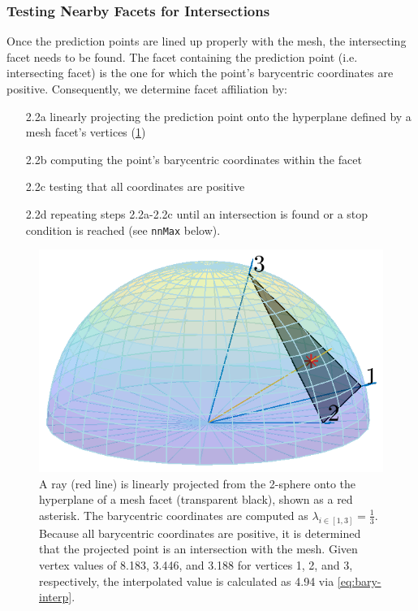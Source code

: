 \documentclass[final,twocolumn,12pt]{elsarticle}
\newcommand{\outpt}{prediction}
\begin{document}
{\begin{appendices}
\subsubsection{Testing Nearby Facets for Intersections}
\label{sec:app:bary:int:facets}
Once the \outpt{} points are lined up properly with the mesh, the intersecting facet needs to be found. The facet containing the \outpt{} point (i.e. intersecting facet) is the one for which the point's barycentric coordinates are positive. Consequently, we determine facet affiliation by:
\begin{enumerate}
    \item[2.2a] linearly projecting the \outpt{} point onto the hyperplane defined by a mesh facet's vertices (\cref{fig:bary-interp})
    \item[2.2b] computing the point's barycentric coordinates within the facet
    \item[2.2c] testing that all coordinates are positive \cite{langerSphericalBarycentricCoordinates2006}
    \item[2.2d] repeating steps 2.2a-2.2c until an intersection is found or a stop condition is reached (see \texttt{nnMax} below).
\end{enumerate}

\begin{figure}
    \centering
    \includegraphics[scale=1]{bary-interp.png}
    \caption{A ray (red line) is linearly projected from the 2-sphere onto the hyperplane of a mesh facet (transparent black), shown as a red asterisk. The barycentric coordinates are computed as $\lambda_{i \in [1,3]} = \frac{1}{3}$. Because all barycentric coordinates are positive, it is determined that the projected point is an intersection with the mesh. Given vertex values of \num{8.183}, \num{3.446}, and \num{3.188} for vertices 1, 2, and 3, respectively, the interpolated value is calculated as \num{4.94} via \cref{eq:bary-interp}.}
    \label{fig:bary-interp}
\end{figure}


\end{appendices}}
\end{document}

